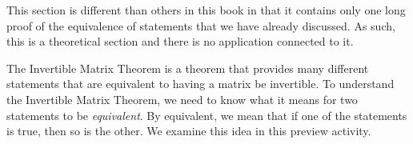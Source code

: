  \label{chap:IMT}

\vspace*{-17 pt}

\vspace*{13 pt}


\label{sec:imt_intro}

This section is different than others in this book in that it contains only one long proof of the equivalence of statements that we have already discussed. As such, this is a theoretical section and there is no application connected to it. 

The Invertible Matrix Theorem is a theorem that provides many different statements that are equivalent to having a matrix be invertible. To understand the Invertible Matrix Theorem, we need to know what it means for two statements to be \emph{equivalent}. By equivalent, we mean that if one of the statements is true, then so is the other. We examine this idea in this preview activity.

